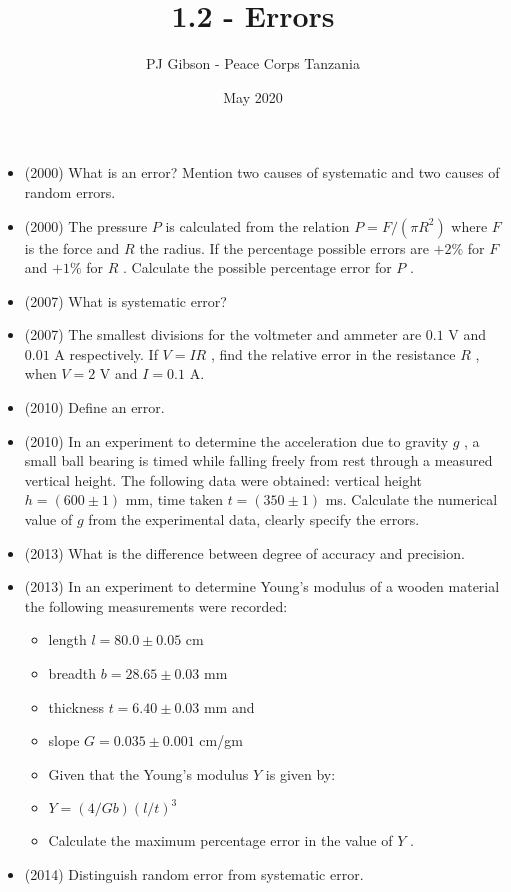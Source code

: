 \documentclass{article}
\title{\textbf{1.2 - Errors}}
\author{PJ Gibson - Peace Corps Tanzania}
\date{May 2020}
\begin{document}
\maketitle

\begin{itemize}
\item (2000)  What is an error? Mention two causes of systematic and two causes of random errors.
\item (2000)  The pressure $ P$ is calculated from the relation $ P=F/( \pi R^{2})$ where $ F$ is the force and $ R$ the radius. If the percentage possible errors are $ +2\%$ for $ F$ and $ +1\%$ for $ R$ . Calculate the possible percentage error for $ P$ .
\item (2007)  What is systematic error?
\item (2007)  The smallest divisions for the voltmeter and ammeter are $ 0.1$ V and $ 0.01$ A respectively.  If $ V=IR$ , find the relative error in the resistance $ R$ , when $ V=2$ V and $ I=0.1$ A.
\item (2010)  Define an error.
\item (2010)  In an experiment to determine the acceleration due to gravity $ g$ , a small ball bearing is timed while falling freely from rest through a measured vertical height. The following data were obtained: vertical height $ h=(600\pm 1)$ mm, time taken $ t=(350\pm 1)$ ms. Calculate the numerical value of $ g$ from the experimental data, clearly specify the errors. 
\item (2013)  What is the difference between degree of accuracy and precision.
\item (2013)  In an experiment to determine Young's modulus of a wooden material the following measurements were recorded:
 \begin{itemize}
\item length $ l=80.0\pm 0.05$ cm 
\item breadth $ b=28.65\pm 0.03$ mm
\item thickness $ t=6.40\pm 0.03$ mm and
\item slope $ G=0.035\pm 0.001$ cm/gm
\item Given that the Young’s modulus $ Y$ is given by:
\item $ Y=(4/Gb)(l/t)^{3}$
\item Calculate the maximum percentage error in the value of $ Y$ .
\end{itemize}
\item (2014)  Distinguish random error from systematic error.
 \begin{itemize}

\end{itemize}
\end{itemize}
\end{document}
